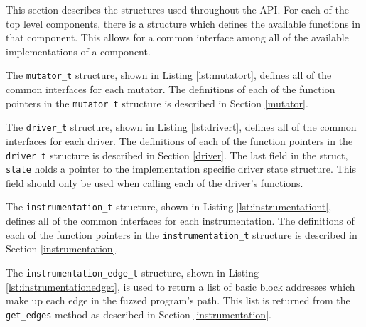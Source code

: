 This section describes the structures used throughout the API.  For each of the
top level components, there is a structure which defines the available functions
in that component.  This allows for a common interface among all of the
available implementations of a component.

\vbox{
}

The \texttt{mutator\_t} structure, shown in Listing \ref{lst:mutatort}, defines
all of the common interfaces for each mutator.  The definitions of each of the
function pointers in the \texttt{mutator\_t} structure is described in Section
\ref{mutator}.

\vbox{
}

The \texttt{driver\_t} structure, shown in Listing \ref{lst:drivert}, defines
all of the common interfaces for each driver.  The definitions of each of the
function pointers in the \texttt{driver\_t} structure is described in Section
\ref{driver}.  The last field in the struct, \texttt{state} holds a pointer to
the implementation specific driver state structure.  This field should only be
used when calling each of the driver's functions.

\vbox{
}

The \texttt{instrumentation\_t} structure, shown in Listing
\ref{lst:instrumentationt}, defines all of the common interfaces for each
instrumentation.  The definitions of each of the function pointers in the
\texttt{instrumentation\_t} structure is described in Section
\ref{instrumentation}.

\vbox{
}

The \texttt{instrumentation\_edge\_t} structure, shown in Listing
\ref{lst:instrumentationedget}, is used to return a list of basic block
addresses which make up each edge in the fuzzed program's path.  This list is
returned from the \texttt{get\_edges} method as described in Section
\ref{instrumentation}.

